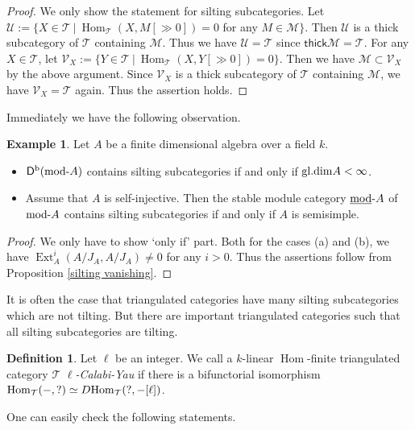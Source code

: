 \documentclass[a4paper,reqno]{amsart}
\theoremstyle{definition}
\newtheorem{definition}[theorem]{Definition}
\newtheorem{example}[theorem]{Example}
\newcommand{\UU}{{\mathcal U}}
\newcommand{\VV}{{\mathcal V}}
\newcommand{\TT}{{\mathcal T}}
\newcommand{\MM}{{\mathcal M}}
\newcommand{\thick}{\mathsf{thick}}
\newcommand{\Hom}{\operatorname{Hom}\nolimits}
\newcommand{\modu}[1]{{\rm{mod}}\text{-}#1} %
\newcommand{\proj}[1]{{\rm{proj}}\text{-}#1} %
\newcommand{\sta}[1]{{\underline{{\rm{mod}}}}\text{-}#1} %
\newcommand{\homo}[3]{{\rm{Hom}}_{#1}(#2, #3)} %
\newcommand{\K}{\mathsf{K}}
\newcommand{\D}{\mathsf{D}}
\newcommand{\Ext}{\operatorname{Ext}\nolimits}
\begin{document}
\begin{proof}
We only show the statement for silting subcategories.
Let $\UU:=\{X\in\TT\ |\ \Hom_{\TT}(X,M[\gg0])=0$ for any $M\in\MM\}$.
Then $\UU$ is a thick subcategory of $\TT$ containing $\MM$.
Thus we have $\UU=\TT$ since $\thick\MM=\TT$.
For any $X\in\TT$, let $\VV_X:=\{Y\in\TT\ |\ \Hom_{\TT}(X,Y[\gg0])=0\}$.
Then we have $\MM\subset\VV_X$ by the above argument.
Since $\VV_X$ is a thick subcategory of $\TT$ containing $\MM$, we have $\VV_X=\TT$ again.
Thus the assertion holds.
\end{proof}

Immediately we have the following observation.

\begin{example}
Let $A$ be a finite dimensional algebra over a field $k$.
\begin{itemize}
\item[(a)] $\D^{\rm b}(\modu A)$ contains silting subcategories if and only if ${\rm gl.dim} A<\infty$.
\item[(b)] Assume that $A$ is self-injective.
Then the stable module category $\sta{A}$ of $\modu{A}$ contains silting subcategories if and only if $A$ is semisimple.
\end{itemize}
\end{example}

\begin{proof}
We only have to show `only if' part.
Both for the cases (a) and (b), we have $\Ext_A^i(A/J_A,A/J_A)\neq0$ for any $i>0$.
Thus the assertions follow from Proposition \ref{silting vanishing}.
\end{proof}

It is often the case that triangulated categories have many silting subcategories which are not tilting.
But there are important triangulated categories such that all silting subcategories are tilting.


\begin{definition}
Let $\ell$ be an integer. We call a $k$-linear $\Hom$-finite triangulated category $\TT$ \emph{$\ell$-Calabi-Yau}
if there is a bifunctorial isomorphism $\homo{\TT}{-}{?}\simeq D\homo{\TT}{?}{-[\ell]}$. 
\end{definition}

One can easily check the following statements.
\end{document}
